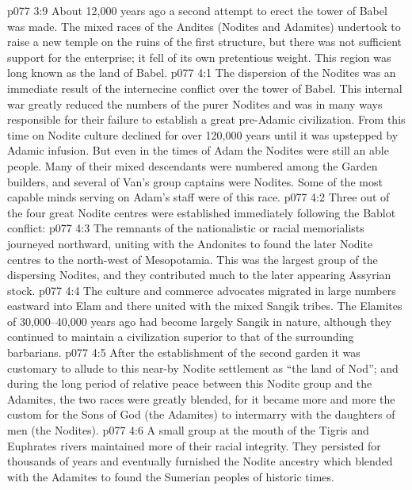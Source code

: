 \vs p077 3:9 \pc About 12,000 years ago a second attempt to erect the tower of Babel was made. The mixed races of the Andites (Nodites and Adamites) undertook to raise a new temple on the ruins of the first structure, but there was not sufficient support for the enterprise; it fell of its own pretentious weight. This region was long known as the land of Babel.
\vs p077 4:1 The dispersion of the Nodites was an immediate result of the internecine conflict over the tower of Babel. This internal war greatly reduced the numbers of the purer Nodites and was in many ways responsible for their failure to establish a great pre\hyp{}Adamic civilization. From this time on Nodite culture declined for over 120,000 years until it was upstepped by Adamic infusion. But even in the times of Adam the Nodites were still an able people. Many of their mixed descendants were numbered among the Garden builders, and several of Van’s group captains were Nodites. Some of the most capable minds serving on Adam’s staff were of this race.
\vs p077 4:2 Three out of the four great Nodite centres were established immediately following the Bablot conflict:
\vs p077 4:3 \bibnobreakspace {} The remnants of the nationalistic or racial memorialists journeyed northward, uniting with the Andonites to found the later Nodite centres to the north\hyp{}west of Mesopotamia. This was the largest group of the dispersing Nodites, and they contributed much to the later appearing Assyrian stock.
\vs p077 4:4 \bibnobreakspace {} The culture and commerce advocates migrated in large numbers eastward into Elam and there united with the mixed Sangik tribes. The Elamites of 30,000--40,000 years ago had become largely Sangik in nature, although they continued to maintain a civilization superior to that of the surrounding barbarians.
\vs p077 4:5 After the establishment of the second garden it was customary to allude to this near\hyp{}by Nodite settlement as “the land of Nod”; and during the long period of relative peace between this Nodite group and the Adamites, the two races were greatly blended, for it became more and more the custom for the Sons of God (the Adamites) to intermarry with the daughters of men (the Nodites).
\vs p077 4:6 \bibnobreakspace {} A small group at the mouth of the Tigris and Euphrates rivers maintained more of their racial integrity. They persisted for thousands of years and eventually furnished the Nodite ancestry which blended with the Adamites to found the Sumerian peoples of historic times.
